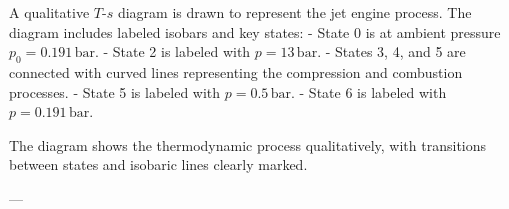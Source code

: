 A qualitative \( T \)-\( s \) diagram is drawn to represent the jet engine process. The diagram includes labeled isobars and key states:  
- State 0 is at ambient pressure \( p_0 = 0.191 \, \text{bar} \).  
- State 2 is labeled with \( p = 13 \, \text{bar} \).  
- States 3, 4, and 5 are connected with curved lines representing the compression and combustion processes.  
- State 5 is labeled with \( p = 0.5 \, \text{bar} \).  
- State 6 is labeled with \( p = 0.191 \, \text{bar} \).  

The diagram shows the thermodynamic process qualitatively, with transitions between states and isobaric lines clearly marked.

---